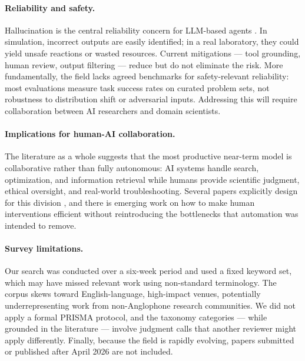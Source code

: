 \documentclass{article}
\begin{document}
\paragraph{Reliability and safety.}
Hallucination is the central reliability concern for LLM-based agents \cite{bran2023chemcrow, boiko2023autonomous}. In simulation, incorrect outputs are easily identified; in a real laboratory, they could yield unsafe reactions or wasted resources. Current mitigations — tool grounding, human review, output filtering — reduce but do not eliminate the risk. More fundamentally, the field lacks agreed benchmarks for safety-relevant reliability: most evaluations measure task success rates on curated problem sets, not robustness to distribution shift or adversarial inputs. Addressing this will require collaboration between AI researchers and domain scientists.

\paragraph{Implications for human-AI collaboration.}
The literature as a whole suggests that the most productive near-term model is collaborative rather than fully autonomous: AI systems handle search, optimization, and information retrieval while humans provide scientific judgment, ethical oversight, and real-world troubleshooting. Several papers explicitly design for this division \cite{rozo2020learning, carbonell2019automating}, and there is emerging work on how to make human interventions efficient without reintroducing the bottlenecks that automation was intended to remove.

\paragraph{Survey limitations.}
Our search was conducted over a six-week period and used a fixed keyword set, which may have missed relevant work using non-standard terminology. The corpus skews toward English-language, high-impact venues, potentially underrepresenting work from non-Anglophone research communities. We did not apply a formal PRISMA protocol, and the taxonomy categories — while grounded in the literature — involve judgment calls that another reviewer might apply differently. Finally, because the field is rapidly evolving, papers submitted or published after April 2026 are not included.
\end{document}
